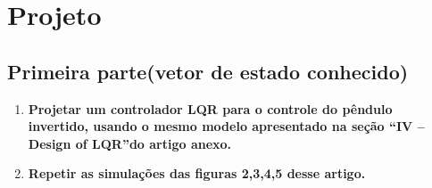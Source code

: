 \documentclass[a4paper]{article}
\begin{document}
\hypersetup{linkbordercolor=black}

\begin{center}
\tableofcontents
\end{center}
\newpage

\section{Projeto}
\begin{figure}[h]
\qquad 
\qquad
{}
\end{figure}

\subsection{Primeira parte(vetor de estado conhecido)}
\begin{enumerate}
    \item \textbf{Projetar um controlador LQR para o controle do pêndulo invertido, usando o mesmo modelo apresentado na seção “IV –Design of LQR”do artigo anexo.}
    \item \textbf{Repetir as simulações das figuras 2,3,4,5 desse artigo.}
    \end{enumerate}
    
\end{document}
